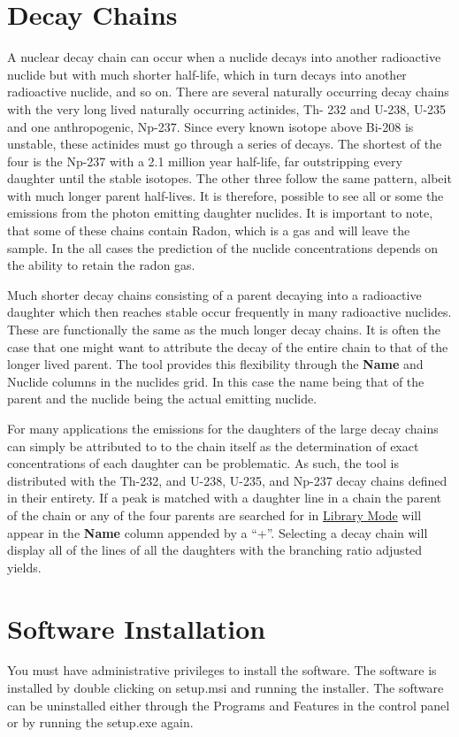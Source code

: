 \documentclass[12pt,report,justified]{SANDreport}
\begin{document}
   \chapter{Decay Chains}\label{sec:decay_chain}
A nuclear decay chain can occur when a nuclide decays into another radioactive nuclide but with
much shorter half-life, which in turn decays into another radioactive nuclide, and so on. There are
several naturally occurring decay chains with the very long lived naturally occurring actinides, Th-
232 and U-238, U-235 and one anthropogenic, Np-237. Since every known isotope above Bi-208 is
unstable, these actinides must go through a series of decays. The shortest of the four is the Np-237
with a 2.1 million year half-life, far outstripping every daughter until the stable isotopes. The other
three follow the same pattern, albeit with much longer parent half-lives. It is therefore, possible to
see all or some the emissions from the photon emitting daughter nuclides. It is important to note,
that some of these chains contain Radon, which is a gas and will leave the sample. In the all cases
the prediction of the nuclide concentrations depends on the ability to retain the radon gas.

Much shorter decay chains consisting of a parent decaying into a radioactive daughter which then
reaches stable occur frequently in many radioactive nuclides. These are functionally the same as
the much longer decay chains. It is often the case that one might want to attribute the decay of the
entire chain to that of the longer lived parent. The tool provides this flexibility through the \textbf{Name}
and Nuclide columns in the nuclides grid. In this case the name being that of the parent and the
nuclide being the actual emitting nuclide.

For many applications the emissions for the daughters of the large decay chains can simply be
attributed to to the chain itself as the determination of exact concentrations of each daughter can
be problematic. As such, the tool is distributed with the Th-232, and U-238, U-235, and Np-237
decay chains defined in their entirety. If a peak is matched with a daughter line in a chain the parent
of the chain or any of the four parents are searched for in \hyperref[sec:libMode]{Library Mode} will
appear in the \textbf{Name} column appended by a “+”. Selecting a decay chain will display all of the
lines of all the daughters with the branching ratio adjusted yields.

   \chapter{Software Installation}\label{sec:install}
You must have administrative privileges to install the software. The software is installed by double
clicking on setup.msi and running the installer. The software can be uninstalled either through the
Programs and Features in the control panel or by running the setup.exe again.
        {}


    
\end{document}

